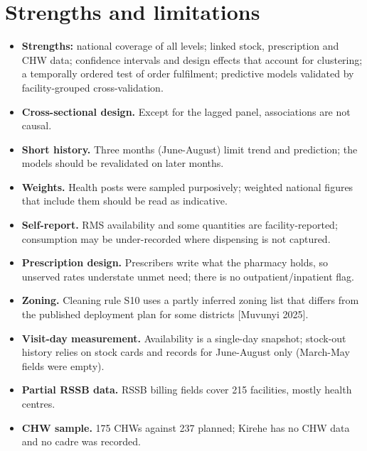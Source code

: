 \documentclass[10pt,a4paper]{report}
\begin{document}
\section{Strengths and limitations}
\begin{itemize}\item \textbf{Strengths:} national coverage of all levels; linked stock, prescription and CHW data; confidence intervals and design effects that account for clustering; a temporally ordered test of order fulfilment; predictive models validated by facility-grouped cross-validation.
\item \textbf{Cross-sectional design.} Except for the lagged panel, associations are not causal.
\item \textbf{Short history.} Three months (June-August) limit trend and prediction; the models should be revalidated on later months.
\item \textbf{Weights.} Health posts were sampled purposively; weighted national figures that include them should be read as indicative.
\item \textbf{Self-report.} RMS availability and some quantities are facility-reported; consumption may be under-recorded where dispensing is not captured.
\item \textbf{Prescription design.} Prescribers write what the pharmacy holds, so unserved rates understate unmet need; there is no outpatient/inpatient flag.
\item \textbf{Zoning.} Cleaning rule S10 uses a partly inferred zoning list that differs from the published deployment plan for some districts [Muvunyi 2025].
\end{itemize}
\begin{itemize}\item \textbf{Visit-day measurement.} Availability is a single-day snapshot; stock-out history relies on stock cards and records for June-August only (March-May fields were empty).
\item \textbf{Partial RSSB data.} RSSB billing fields cover 215 facilities, mostly health centres.
\item \textbf{CHW sample.} 175 CHWs against 237 planned; Kirehe has no CHW data and no cadre was recorded.
\end{itemize}
\end{document}
